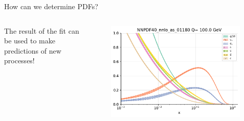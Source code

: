 \documentclass[8pt,t]{beamer}
\begin{document}
\begin{frame}{How can we determine PDFs?}
\begin{columns}
\begin{column}{0.5\textwidth}
      The result of the fit can be used to make predictions of new processes!
    \end{column}
    \begin{column}{0.5\textwidth}
      \begin{figure}
        \includegraphics[width=0.99\textwidth]{pdg_100gev.pdf}
      \end{figure}
    \end{column}
  \end{columns}
\end{frame}
\end{document}
